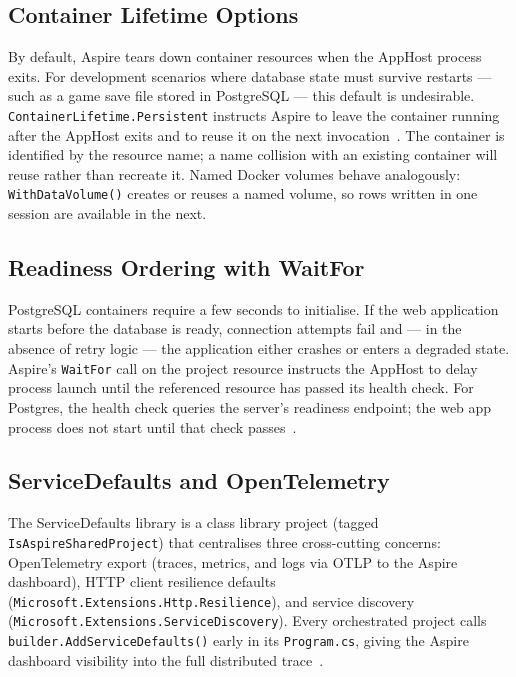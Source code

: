 \subsection{Container Lifetime Options}

By default, Aspire tears down container resources when the AppHost process exits. For development scenarios where database state must survive restarts --- such as a game save file stored in PostgreSQL --- this default is undesirable. \texttt{ContainerLifetime.Persistent} instructs Aspire to leave the container running after the AppHost exits and to reuse it on the next invocation~\cite{aspiredocs2024}. The container is identified by the resource name; a name collision with an existing container will reuse rather than recreate it. Named Docker volumes behave analogously: \texttt{WithDataVolume()} creates or reuses a named volume, so rows written in one session are available in the next.

\subsection{Readiness Ordering with WaitFor}

PostgreSQL containers require a few seconds to initialise. If the web application starts before the database is ready, connection attempts fail and --- in the absence of retry logic --- the application either crashes or enters a degraded state. Aspire's \texttt{WaitFor} call on the project resource instructs the AppHost to delay process launch until the referenced resource has passed its health check. For Postgres, the health check queries the server's readiness endpoint; the web app process does not start until that check passes~\cite{aspiredocs2024}.

\subsection{ServiceDefaults and OpenTelemetry}

The ServiceDefaults library is a class library project (tagged \texttt{IsAspireSharedProject}) that centralises three cross-cutting concerns: OpenTelemetry export (traces, metrics, and logs via OTLP to the Aspire dashboard), HTTP client resilience defaults (\texttt{Microsoft.Extensions.Http.Resilience}), and service discovery (\texttt{Microsoft.Extensions.ServiceDiscovery}). Every orchestrated project calls \texttt{builder.AddServiceDefaults()} early in its \texttt{Program.cs}, giving the Aspire dashboard visibility into the full distributed trace~\cite{aspiredocs2024,otelspec2023}.
